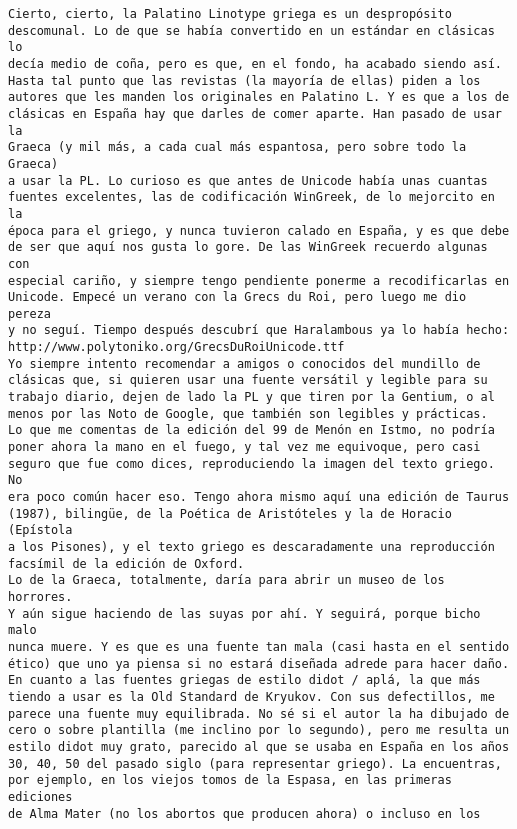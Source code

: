 \documentclass[a4paper,10pt]{article}
\begin{document}
\begin{lstlisting}
Cierto, cierto, la Palatino Linotype griega es un despropósito
descomunal. Lo de que se había convertido en un estándar en clásicas lo
decía medio de coña, pero es que, en el fondo, ha acabado siendo así.
Hasta tal punto que las revistas (la mayoría de ellas) piden a los
autores que les manden los originales en Palatino L. Y es que a los de
clásicas en España hay que darles de comer aparte. Han pasado de usar la
Graeca (y mil más, a cada cual más espantosa, pero sobre todo la Graeca)
a usar la PL. Lo curioso es que antes de Unicode había unas cuantas
fuentes excelentes, las de codificación WinGreek, de lo mejorcito en la
época para el griego, y nunca tuvieron calado en España, y es que debe
de ser que aquí nos gusta lo gore. De las WinGreek recuerdo algunas con
especial cariño, y siempre tengo pendiente ponerme a recodificarlas en
Unicode. Empecé un verano con la Grecs du Roi, pero luego me dio pereza
y no seguí. Tiempo después descubrí que Haralambous ya lo había hecho: 
http://www.polytoniko.org/GrecsDuRoiUnicode.ttf
Yo siempre intento recomendar a amigos o conocidos del mundillo de
clásicas que, si quieren usar una fuente versátil y legible para su
trabajo diario, dejen de lado la PL y que tiren por la Gentium, o al
menos por las Noto de Google, que también son legibles y prácticas.
Lo que me comentas de la edición del 99 de Menón en Istmo, no podría
poner ahora la mano en el fuego, y tal vez me equivoque, pero casi
seguro que fue como dices, reproduciendo la imagen del texto griego. No
era poco común hacer eso. Tengo ahora mismo aquí una edición de Taurus
(1987), bilingüe, de la Poética de Aristóteles y la de Horacio (Epístola
a los Pisones), y el texto griego es descaradamente una reproducción
facsímil de la edición de Oxford.
Lo de la Graeca, totalmente, daría para abrir un museo de los horrores.
Y aún sigue haciendo de las suyas por ahí. Y seguirá, porque bicho malo
nunca muere. Y es que es una fuente tan mala (casi hasta en el sentido
ético) que uno ya piensa si no estará diseñada adrede para hacer daño.
En cuanto a las fuentes griegas de estilo didot / aplá, la que más
tiendo a usar es la Old Standard de Kryukov. Con sus defectillos, me
parece una fuente muy equilibrada. No sé si el autor la ha dibujado de
cero o sobre plantilla (me inclino por lo segundo), pero me resulta un
estilo didot muy grato, parecido al que se usaba en España en los años
30, 40, 50 del pasado siglo (para representar griego). La encuentras,
por ejemplo, en los viejos tomos de la Espasa, en las primeras ediciones
de Alma Mater (no los abortos que producen ahora) o incluso en los

\end{lstlisting}
\end{document}
